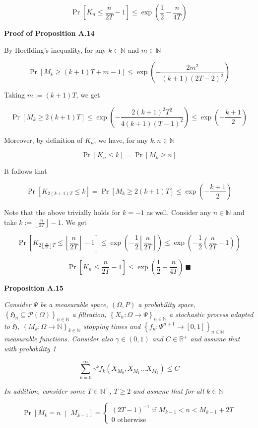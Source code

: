 \documentclass[a4paper]{article}
\newcommand{\Co}[1]{}
\newcommand{\AP}[1]{\left(#1\right)}
\newcommand{\AB}[1]{\left[#1\right]}
\newcommand{\AC}[1]{\left\{#1\right\}}
\newcommand{\ABM}[2]{\left[#1\;\middle\vert\;#2\right]}
\newcommand{\Floor}[1]{\left\lfloor #1 \right\rfloor}
\newcommand{\Pb}[1]{\operatorname{Pr}\AB{#1}}
\newcommand{\CP}[3]{\underset{#1}{\operatorname{Pr}}\ABM{#2}{#3}}
\newcommand{\Nats}{\mathbb{N}}
\newcommand{\Reals}{\mathbb{R}}
\newcommand{\PS}[1]{\mathcal{P}\AP{#1}} %
\newcommand{\Fi}{\mathfrak{H}}
\begin{document}
$$\Pb{K_{n}\leq {\frac{n}{2T}}-1}\leq\exp\AP{\frac{1}{2}-\frac{n}{4T}}$$


\textbf{Proof of Proposition A.14}\Co{b}

By Hoeffding's inequality, for any $k\in\Nats$ and $m\in\Nats$

$$\Pb{M_k\geq (k+1)T+m-1}\leq\exp\AP{-\frac{2m^2}{(k+1)\AP{2T-2}^2}}$$

Taking $m:=(k+1)T$, we get

$$\Pb{M_k\geq 2(k+1)T}\leq\exp\AP{-\frac{2(k+1)^2T^2}{4(k+1)\AP{T-1}^2}}\leq\exp\AP{-\frac{k+1}{2}}$$

Moreover, by definition of $K_n$, we have, for any $k,n\in\Nats$

$$\Pb{K_n\leq k}=\Pb{M_k\geq n}$$

It follows that

$$\Pb{K_{2(k+1)T}\leq k}=\Pb{M_k\geq 2(k+1)T}\leq\exp\AP{-\frac{k+1}{2}}$$

Note that the above trivially holds for $k=-1$ as well. Consider any $n\in\Nats$ and take $k:=\Floor{\frac{n}{2T}}-1$. We get

$$\Pb{K_{2\Floor{\frac{n}{2T}}T}\leq \Floor{\frac{n}{2T}}-1}\leq\exp\AP{-\frac{1}{2}\Floor{\frac{n}{2T}}}\leq\exp\AP{-\frac{1}{2}\AP{\frac{n}{2T}-1}}$$

$$\Pb{K_{n}\leq {\frac{n}{2T}}-1}\leq\exp\AP{\frac{1}{2}-\frac{n}{4T}}\ \blacksquare$$

\textbf{Proposition A.15}\Co{b}

\textit{Consider $\Psi$ be a measurable space, $(\Omega,P)$ a probability space, $\AC{\Fi_n\subseteq\PS{\Omega}}_{n\in\Nats}$ a filtration, $\AC{X_n:\Omega\rightarrow\Psi}_{n\in\Nats}$ a stochastic process adapted to $\Fi$, $\AC{M_k:\Omega\rightarrow\Nats}_{k\in\Nats}$ stopping times and $\AC{f_n:\Psi^{n+1}\rightarrow[0,1]}_{n\in\Nats}$ measurable functions. Consider also $\gamma\in(0,1)$ and $C\in\Reals^+$ and assume that with probability 1}\Co{i}

$$\sum_{k=0}^\infty \gamma^kf_k\AP{X_{M_0},X_{M_1}\ldots X_{M_{k}}} \leq C$$

\textit{In addition, consider some $T\in\Nats^+$, $T\geq2$ and assume that for all $k\in\Nats$}\Co{i}

$$\CP{}{M_{k}=n}{M_{k-1}}=\begin{cases} \AP{2T-1}^{-1} \text{ if } M_{k-1} < n < M_{k-1}+2T\\ 0 \text{ otherwise} \end{cases}$$
\end{document}
